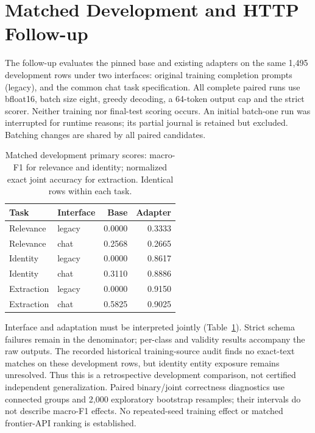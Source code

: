\section{Matched Development and HTTP Follow-up}
The follow-up evaluates the pinned base and existing adapters on the same
1,495 development rows under two interfaces: original training completion
prompts (legacy), and the common chat task specification. All complete paired
runs use bfloat16, batch size eight, greedy decoding, a 64-token output cap and
the strict scorer. Neither training nor final-test scoring occurs. An initial
batch-one run was interrupted for runtime reasons; its partial journal is
retained but excluded. Batching changes are shared by all paired candidates.

\begin{table}[t]
\centering\small
\caption{Matched development primary scores: macro-F1 for relevance and identity;
normalized exact joint accuracy for extraction. Identical rows within each task.}
\label{tab:followup}
\begin{tabular}{llrr}\toprule
Task & Interface & Base & Adapter\\\midrule
Relevance & legacy & 0.0000 & 0.3333 \\
Relevance & chat & 0.2568 & 0.2665 \\
Identity & legacy & 0.0000 & 0.8617 \\
Identity & chat & 0.3110 & 0.8886 \\
Extraction & legacy & 0.0000 & 0.9150 \\
Extraction & chat & 0.5825 & 0.9025 \\
\bottomrule\end{tabular}\end{table}

Interface and adaptation must be interpreted jointly (Table~\ref{tab:followup}).
Strict schema failures remain in the denominator; per-class and validity
results accompany the raw outputs. The recorded historical training-source
audit finds no exact-text matches on these development rows, but identity
entity exposure remains unresolved. Thus this is a retrospective development
comparison, not certified independent generalization. Paired binary/joint
correctness diagnostics use connected groups and 2,000 exploratory bootstrap
resamples; their intervals do not describe macro-F1 effects. No repeated-seed
training effect or matched frontier-API ranking is established.

